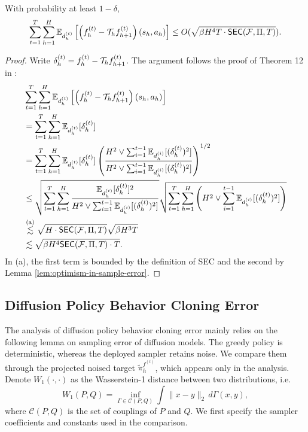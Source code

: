 \begin{lem}
    With probability at least $1-\delta$, 
    $$\sum_{t=1}^T \sum_{h=1}^H\mathbb{E}_{d_h^{(t)}}\left[\left(f_h^{(t)}-{\mathcal{T}}_h f_{h+1}^{(t)}\right)\left(s_h, a_h\right)\right] \leq O(\sqrt{\beta H^4 T\cdot \mathsf{SEC}({\mathcal{F}}, \Pi, T)}).$$
    \label{lem:critic-estimation-error}
\end{lem}
\begin{proof}
    Write $\delta_h^{(t)}=f_h^{(t)}-{\mathcal{T}}_hf_{h+1}^{(t)}$. The argument follows the proof of Theorem 12 in \citet{xie2022role}:
\begin{align*}
    &\sum_{t=1}^T \sum_{h=1}^H\mathbb{E}_{d_h^{(t)}}\left[\left(f_h^{(t)}-{\mathcal{T}}_h f_{h+1}^{(t)}\right)\left(s_h, a_h\right)\right] \\
    &= \sum_{t=1}^T \sum_{h=1}^H \mathbb{E}_{d_h^{(t)}}[\delta_h^{(t)}]\\
    &= \sum_{t=1}^T \sum_{h=1}^H \mathbb{E}_{d_h^{(t)}}[\delta_h^{(t)}] \left(\frac{H^2 \vee \sum_{i=1}^{t-1}\mathbb{E}_{d_h^{(i)}}[(\delta_h^{(t)})^2]}{H^2 \vee \sum_{i=1}^{t-1}\mathbb{E}_{d_h^{(i)}}[(\delta_h^{(t)})^2]}\right)^{1/2} \\
    &\leq \sqrt{\sum_{t=1}^T\sum_{h=1}^H \frac{\mathbb{E}_{d_h^{(t)}}[\delta_h^{(t)}]^2}{H^2 \vee \sum_{i=1}^{t-1}\mathbb{E}_{d_h^{(i)}}[(\delta_h^{(t)})^2]}}\sqrt{\sum_{t=1}^T\sum_{h=1}^H \left(H^2 \vee \sum_{i=1}^{t-1}\mathbb{E}_{d_h^{(i)}}[(\delta_h^{(t)})^2]\right)} \\
    &\overset{\text{(a)}}{\lesssim} \sqrt{H\cdot\mathsf{SEC}({\mathcal{F}}, \Pi, T)}\sqrt{\beta H^3 T}\\
    &\lesssim \sqrt{\beta H^4 \mathsf{SEC}({\mathcal{F}}, \Pi, T)\cdot T}.
\end{align*}
    In (a), the first term is bounded by the definition of SEC and the second by Lemma \ref{lem:optimism-in-sample-error}.
\end{proof}



\subsection{Diffusion Policy Behavior Cloning Error}
\label{app:bc-sampler-constants}
The analysis of diffusion policy behavior cloning error mainly relies on the following lemma on sampling error of diffusion models. The greedy policy is deterministic, whereas the deployed sampler retains noise. We compare them through the projected noised target $\widetilde\pi_h^{f^{(t)}}$, which appears only in the analysis. Denote $W_1(\cdot, \cdot)$ as the Wasserstein-1 distance between two distributions, i.e.
\[
 W_1(P,Q)=\inf_{\Gamma\in\mathcal C(P,Q)}\int\|x-y\|_2\,d\Gamma(x,y),
\]
where $\mathcal C(P,Q)$ is the set of couplings of $P$ and $Q$. We first specify the sampler coefficients and constants used in the comparison.

